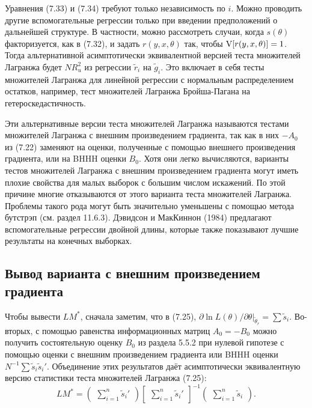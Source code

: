 Уравнения (7.33) и (7.34) требуют только независимость по $i$. Можно проводить другие вспомогательные регрессии только при введении предположений о дальнейшей структуре. В частности, можно рассмотреть случаи, когда $s(\theta)$ факторизуется, как в (7.32), и задать $r(y, x, \theta)$ так, чтобы $\mathrm{V}[r(y, x, \theta)] = 1$. Тогда альтернативной асимптотически эквивалентной версией теста множителей Лагранжа будет $NR_u^2$ из регрессии $\tilde{r}_i$ на $\tilde{g}_i$. Это включает в себя тесты множителей Лагранжа для линейной регрессии с нормальным распределением остатков, например, тест множителей Лагранжа Бройша-Пагана на гетероскедастичность.

Эти альтернативные версии теста множителей Лагранжа называются тестами множителей Лагранжа с внешним произведением градиента, так как в них $-A_0$ из (7.22) заменяют на оценки, полученные с помощью внешнего произведения градиента, или на BHHH оценки $B_0$. Хотя они легко вычисляются, варианты тестов множителей Лагранжа с внешним произведением градиента могут иметь плохие свойства для малых выборок с большим числом искажений. По этой причине многие отказываются от этого варианта теста множителей Лагранжа. Проблемы такого рода могут быть значительно уменьшены с помощью метода бутстрэп (см. раздел 11.6.3). Дэвидсон и МакКиннон (1984) предлагают вспомогательные регрессии двойной длины, которые также показывают лучшие результаты на конечных выборках.

\subsection{Вывод варианта с внешним произведением градиента}

Чтобы вывести $LM^*$, сначала заметим, что в (7.25), $\partial{\ln L(\theta)/\partial{\theta}}|_{\tilde{\theta}_r} = \sum \tilde{s}_i$. Во-вторых, с помощью равенства информационных матриц $A_0 = - B_0$ можно получить состоятельную оценку $B_0$ из раздела 5.5.2 при нулевой гипотезе с помощью оценки с внешним произведением градиента или BHHH оценки $N^{-1}\sum \tilde{s}_i\tilde{s}_i'$. Объединение этих результатов даёт асимптотически эквивалентную версию статистики теста множителей Лагранжа (7.25):
\begin{equation}
LM^* = \begin{pmatrix} \sum_{i=1}^n \tilde{s}_i' \end{pmatrix} \begin{bmatrix} \sum_{i=1}^n \tilde{s}_i' \end{bmatrix}^{-1} \begin{pmatrix} \sum_{i=1}^n \tilde{s}_i \end{pmatrix}.
\end{equation}

